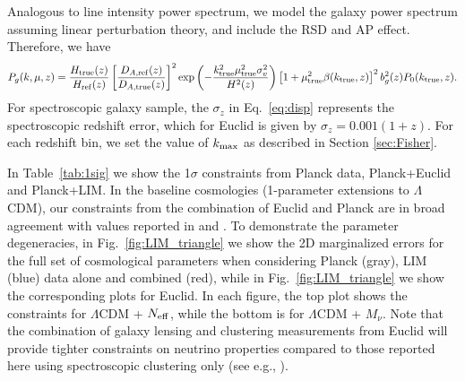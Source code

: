 \documentclass[twocolumn]{aastex631}
\newcommand{\be}{\begin{equation}}
\newcommand{\ee}{\end{equation}}
\begin{document}
Analogous to line intensity power spectrum, we model the galaxy power spectrum assuming linear perturbation theory, and include the RSD and AP effect. Therefore, we have
\be
    P_g(k,\mu,z) = \frac{H_{\rm true}(z)}{H_{\rm ref}(z)}  \left[\frac{D_{A,{\rm ref}}(z)}{D_{A,{\rm true}}(z)}\right]^2 {\rm exp}\left(-\frac{k_{\rm true}^2 \mu_{\rm true}^2 \sigma_v^2}{H^2(z)}\right)  \left[1+\mu_{\rm true}^2\beta(k_{\rm true},z)\right]^2 b_g^2(z) P_0(k_{\rm true},z).
\ee
For spectroscopic galaxy sample, the $\sigma_z$ in Eq.~\eqref{eq:disp} represents the spectroscopic redshift error, which for Euclid is given by $\sigma_z = 0.001 (1+z)$. For each redshift bin, we set the value of $k_{\rm max}$ as described in Section \ref{sec:Fisher}.

In Table~\ref{tab:1sig} we show the 1$\sigma$ constraints from Planck data, Planck+Euclid and Planck+LIM. In the baseline cosmologies (1-parameter extensions to $\Lambda$CDM), our constraints from the combination of Euclid and Planck are in broad agreement with values reported in \cite{Obuljen:2017jiy} and \cite{Sprenger:2018tdb}. To demonstrate the parameter degeneracies, in Fig.~\ref{fig:LIM_triangle} we show the 2D marginalized errors for the full set of cosmological parameters when considering Planck (gray), LIM (blue) data alone and combined (red), while in Fig.~\ref{fig:LIM_triangle} we show the corresponding plots for Euclid. In each figure, the top plot shows the constraints for $\Lambda$CDM + $N_{\rm eff}$, while the bottom is for $\Lambda$CDM + $M_\nu$. Note that the combination of galaxy lensing and clustering measurements from Euclid will provide tighter constraints on neutrino properties compared to those reported here using spectroscopic clustering only (see e.g., \citealt{Sprenger:2018tdb}).
\end{document}
